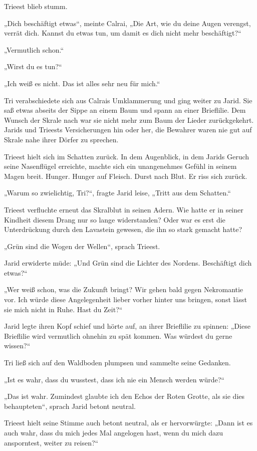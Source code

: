 Trieest blieb stumm.

„Dich beschäftigt etwas“, meinte Calrai, „Die Art, wie du deine Augen verengst, verrät dich. Kannst du etwas tun, um damit es dich nicht mehr beschäftigt?“

„Vermutlich schon.“

„Wirst du es tun?“

„Ich weiß es nicht. Das ist alles sehr neu für mich.“

Tri verabschiedete sich aus Calrais Umklammerung und ging weiter zu Jarid. Sie saß etwas abseits der Sippe an einem Baum und spann an einer Brieflilie. Dem Wunsch der Skrale nach war sie nicht mehr zum Baum der Lieder zurückgekehrt. Jarids und Trieests Versicherungen hin oder her, die Bewahrer waren nie gut auf Skrale nahe ihrer Dörfer zu sprechen.

Trieest hielt sich im Schatten zurück. In dem Augenblick, in dem Jarids Geruch seine Nasenflügel erreichte, machte sich ein unangenehmes Gefühl in seinem Magen breit. Hunger. Hunger auf Fleisch. Durst nach Blut. Er riss sich zurück.

„Warum so zwielichtig, Tri?“, fragte Jarid leise, „Tritt aus dem Schatten.“

Trieest verfluchte erneut das Skralblut in seinen Adern. Wie hatte er in seiner Kindheit diesem Drang nur so lange widerstanden? Oder war es erst die Unterdrückung durch den Lavastein gewesen, die ihn so stark gemacht hatte?

„Grün sind die Wogen der Wellen“, sprach Trieest.

Jarid erwiderte müde: „Und Grün sind die Lichter des Nordens. Beschäftigt dich etwas?“

„Wer weiß schon, was die Zukunft bringt? Wir gehen bald gegen Nekromantie vor. Ich würde diese Angelegenheit lieber vorher hinter uns bringen, sonst lässt sie mich nicht in Ruhe. Hast du Zeit?“

Jarid legte ihren Kopf schief und hörte auf, an ihrer Brieflilie zu spinnen: „Diese Brieflilie wird vermutlich ohnehin zu spät kommen. Was würdest du gerne wissen?“

Tri ließ sich auf den Waldboden plumpsen und sammelte seine Gedanken.

„Ist es wahr, dass du wusstest, dass ich nie ein Mensch werden würde?“

„Das ist wahr. Zumindest glaubte ich den Echos der Roten Grotte, als sie dies behaupteten“, sprach Jarid betont neutral.

Trieest hielt seine Stimme auch betont neutral, als er hervorwürgte: „Dann ist es auch wahr, dass du mich jedes Mal angelogen hast, wenn du mich dazu ansporntest, weiter zu reisen?“

